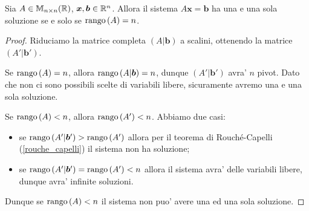 \begin{proposition}\label{sistema_quadrato_n_pivot_unica_soluzione}
    Sia $A \in \mathbb{M}_{n \times n}(\mathbb{R})$, $\bm{x}, \bm{b} \in \mathbb{R}^n$. Allora il sistema $A\bm x = \bm b$ ha una e una sola soluzione se e solo se $\operatorname{rango}\left( A \right) = n$.
\end{proposition}
\begin{proof}
    Riduciamo la matrice completa $(A | \bm b)$ a scalini, ottenendo la matrice $(A' | \bm b')$.

    Se $\operatorname{rango}\left( A \right) = n$, allora $\operatorname{rango}\left( A | \bm b \right) = n$, dunque $(A' | \bm b')$ avra' $n$ pivot. Dato che non ci sono possibili scelte di variabili libere, sicuramente avremo una e una sola soluzione.

    Se $\operatorname{rango}\left( A \right) < n$, allora $\operatorname{rango}\left( A' \right) < n$. Abbiamo due casi: \begin{itemize}
        \item se $\operatorname{rango}\left( A' | \bm b' \right) > \operatorname{rango}\left( A' \right)$ allora per il teorema  di Rouché-Capelli (\ref{rouche_capelli}) il sistema non ha soluzione;
        \item se $\operatorname{rango}\left( A' | \bm b' \right) = \operatorname{rango}\left( A' \right) < n$ allora il sistema avra' delle variabili libere, dunque avra' infinite soluzioni.
    \end{itemize}
    Dunque se $\operatorname{rango}\left( A \right) < n$ il sistema non puo' avere una ed una sola soluzione.
\end{proof}

